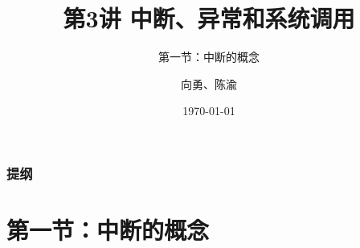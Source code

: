 


\title[第3讲]{第3讲 中断、异常和系统调用} %
\subtitle{第一节：中断的概念}
\author{向勇、陈渝} %
\date{\today} %



\begin{frame}
\titlepage %
\end{frame}

\begin{frame}
\frametitle{提纲} %
\tableofcontents %
\end{frame}

\section{第一节：中断的概念}%

